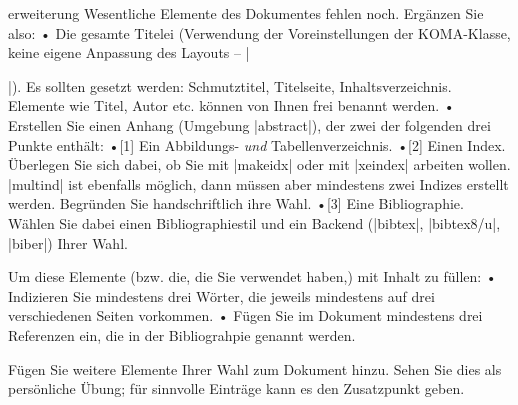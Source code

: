 \documentclass[
	draft,
	blatt=9,
	ausgabe=12.\,06.\,2010,
	rückgabe=18.\,06.\,2010
]{lcourse-hd}
\begin{document}
\begin{exercise}[
  name={Erweiterung},
  punkte=6,
  abgabe = \begin{itemize}\item {Den gesamten Quellcode als Email (mehrere Dateien). Bitte überlegen Sie sich, falls möglich, eine Archivierung (zip o.\,ä.), um den Transfer zu erleichtern.}
\item Fertiges Dokument (pdf) per Mail.
\item {Ausdruck von Inhaltsverzeichnis, erster Textseite sowie Index bzw. Bibliographie. Also drei repräsentative Seiten Ihres Dokumentes.}
\item Handschriftliche Begründung für die Indexwahl.
\end{itemize}
]{erweiterung}
Wesentliche Elemente des Dokumentes fehlen noch. Ergänzen Sie also:
• Die gesamte Titelei (Verwendung der Voreinstellungen der KOMA-Klasse, keine eigene Anpassung des Layouts – |\maketitle|). Es sollten gesetzt werden: 
Schmutztitel, Titelseite, Inhaltsverzeichnis. Elemente wie Titel, Autor etc. können von Ihnen frei benannt werden.
• Erstellen Sie einen Anhang (Umgebung |abstract|), der zwei der folgenden drei Punkte enthält:
•[1] Ein Abbildungs- \emph{und} Tabellenverzeichnis.
•[2] Einen Index. Überlegen Sie sich dabei, ob Sie mit |makeidx| oder mit |xeindex| arbeiten wollen. |multind| ist ebenfalls möglich, dann müssen aber mindestens zwei Indizes erstellt werden. Begründen Sie handschriftlich ihre Wahl.
•[3] Eine Bibliographie. Wählen Sie dabei einen Bibliographiestil und ein Backend (|bibtex|, |bibtex8/u|, |biber|) Ihrer Wahl.

Um diese Elemente (bzw. die, die Sie verwendet haben,) mit Inhalt zu füllen:
• Indizieren Sie mindestens drei Wörter, die jeweils mindestens auf drei verschiedenen Seiten vorkommen.
• Fügen Sie im Dokument mindestens drei Referenzen ein, die in der Bibliograhpie genannt werden.

Fügen Sie weitere Elemente Ihrer Wahl zum Dokument hinzu. Sehen Sie dies als persönliche Übung; für sinnvolle Einträge kann es den Zusatzpunkt geben.

\end{exercise}
\end{document}
